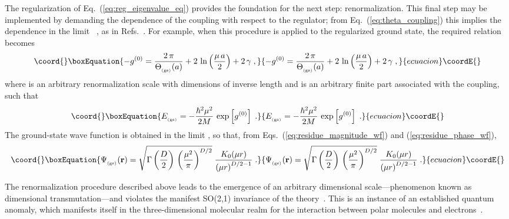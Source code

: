 \documentclass[a4paper,preprint,draft,showpacs,amsmath,amsfonts,amssymb,aps,prd]{revtex4}%
\begin{document}
The regularization of 
Eq.~(\ref{eq:reg_eigenvalue_eq})
provides the foundation for the next step: renormalization.
This final step may be implemented by
demanding the dependence of the coupling with respect to the
regulator; from Eq.~(\ref{eq:theta_coupling})
this implies the dependence
 \coordHE{}
in the limit \coordHE{}~\cite{running_coupling}, 
as in Refs.~\cite{gup:93,cam:00,cam:01}. 
For example, when this procedure is applied to the regularized ground state,
the required relation becomes
\begin{equation}\coord{}\boxEquation{
- 
g^{(0)}
=
\frac{2 \, \pi}{ \Theta_{_{\rm (gs)}} (a) } +
2 \, \ln \left( \frac{\mu \, a}{2} \right)
+ 2 \, \gamma
\;  ,
\label{eq:cutoff_BS_regularized_relation}
}{
- 
g^{(0)}
=
\frac{2 \, \pi}{ \Theta_{_{\rm (gs)}} (a) } +
2 \, \ln \left( \frac{\mu \, a}{2} \right)
+ 2 \, \gamma
\;  ,
}{ecuacion}\coordE{}\end{equation}
where \myHighlight{$\mu$}\coordHE{} is an arbitrary
renormalization scale with dimensions of inverse length
and \coordHE{} is an arbitrary finite part associated with the
coupling, such that
\begin{equation}\coord{}\boxEquation{
E_{_{\rm (gs)}}
=
- 
\frac{\hbar^{2}
\mu^{2}}{2M}
\,
\exp \left[
g^{(0)} 
\right]
\;  .
\label{eq:ISP_GS}
}{
E_{_{\rm (gs)}}
=
- 
\frac{\hbar^{2}
\mu^{2}}{2M}
\,
\exp \left[
g^{(0)} 
\right]
\;  .
}{ecuacion}\coordE{}\end{equation}
The ground-state wave function 
is obtained in the limit
\coordHE{}, so that,
from Eqs.~(\ref{eq:residue_magnitude_wf})
and (\ref{eq:residue_phase_wf}),
\begin{equation}\coord{}\boxEquation{
\Psi_{_{\rm (gs)}}
 ({\bf r})
=
\sqrt{
\Gamma \left( \frac{D}{2} \right) \,
\left( 
\frac{\mu^{2}}{\pi}
\right)^{D/2}
}
\;
\frac{K_{0} (\mu r)}
{ \left( \mu r \right)^{D/2 -1} }
\;  .
\label{eq:ISP_wf_normalized_renormalized}
}{
\Psi_{_{\rm (gs)}}
 ({\bf r})
=
\sqrt{
\Gamma \left( \frac{D}{2} \right) \,
\left( 
\frac{\mu^{2}}{\pi}
\right)^{D/2}
}
\;
\frac{K_{0} (\mu r)}
{ \left( \mu r \right)^{D/2 -1} }
\;  .
}{ecuacion}\coordE{}\end{equation}

The renormalization
procedure described above leads to the emergence of an arbitrary 
dimensional scale---phenomenon known as dimensional transmutation---and 
violates the manifest SO(2,1) invariance of the 
theory~\cite{jac:72,alf:76,jac:80,cam:01b}. This is
an instance of an established 
quantum anomaly, which manifests itself in the
three-dimensional molecular realm 
for the interaction between polar molecules and electrons~\cite{cam:01b}.
\end{document}
